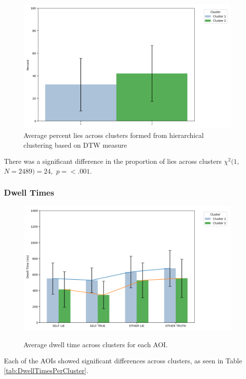 \documentclass[man, floatsintext]{apa7}
\begin{document}
\begin{figure}[H]
	\centering
	\includegraphics[width=0.75\linewidth]{../plots/ALLTRIAL/PercentLies.png}
		\caption{Average percent lies across clusters formed from hierarchical clustering based on DTW measure}
	\label{fig:PercentLiePerCluster}
\end{figure}

There was a significant difference in the proportion of lies across clusters $\chi^2(1,$ $N=2489) = 24,$ $p=<.001$.

\subsubsection{Dwell Times}

\begin{figure}[H]
	\caption{Average dwell time across clusters for each AOI.}
	\centering
	\includegraphics[width=0.75\linewidth]{../plots/ALLTRIAL/DwellTimes.png}
	\label{fig:DwellTimesPerCluster}
\end{figure}

Each of the AOIs showed significant differences across clusters, as seen in Table \ref{tab:DwellTimesPerCluster}.
\end{document}
